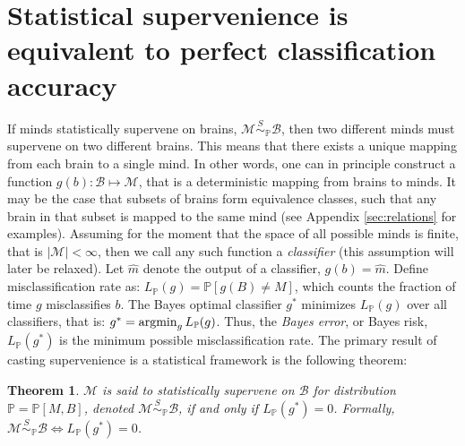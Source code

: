 \documentclass{article}
\newcommand{\mB}{\mathcal{B}}
\newcommand{\mM}{\mathcal{M}}
\newcommand{\PP}{\mathbb{P}}           %
\newcommand{\II}{\mathbb{I}}           %
\providecommand{\mc}[1]{\mathcal{#1}}
\providecommand{\mh}[1]{\widehat{#1}}
\newcommand{\argmin}{\operatornamewithlimits{argmin}}
\newcommand{\MsB}{\mM \overset{S}{\sim}_{\PP} \mB}
\newtheorem{thm}{Theorem}
\begin{document}



\section{Statistical supervenience is equivalent to perfect classification accuracy} %
\label{sub:theoretical_results}

If minds statistically supervene on brains, $\MsB$, then two different minds must supervene on two different brains.  This means that there exists a unique mapping from each brain to a single mind.  In other words, one can in principle construct a function $g(b): \mB \mapsto \mM$, that is a deterministic mapping from brains to minds.  It may be the case that subsets of brains form equivalence classes, such that any brain in that subset is mapped to the same mind (see Appendix \ref{sec:relations} for examples).  Assuming for the moment that the space of all possible minds is finite, that is $| \mM| < \infty$, then we call any such function a \emph{classifier} (this assumption will later be relaxed).  Let $\mh{m}$ denote the output of a classifier, $g(b)=\mh{m}$.  Define misclassification rate as:
	$L_{\PP}(g) = \PP[g(B) \neq M]$, %
which counts the fraction of time $g$ misclassifies $b$. The Bayes optimal classifier $g^*$ minimizes $L_{\PP}(g)$ over all classifiers, that is:
	$g^* = \argmin_{g} L_{\PP}(g)$.
Thus, the \emph{Bayes error}, or Bayes risk, $L_{\PP}(g^*)$ is the minimum possible misclassification rate. The primary result of casting supervenience is a statistical framework is the following theorem: 
\begin{thm}
\label{thm1} 
$\mM$ is said to \textit{statistically supervene} on $\mB$ for distribution $\PP=\PP[M,B]$, denoted $\mM \overset{S}{\sim}_{\PP} \mB$, if and only if $L_{\PP}(g^*) = 0$. Formally, \mbox{$\MsB \Leftrightarrow L_{\PP}(g^*)=0$}.  
\end{thm}
\end{document}

